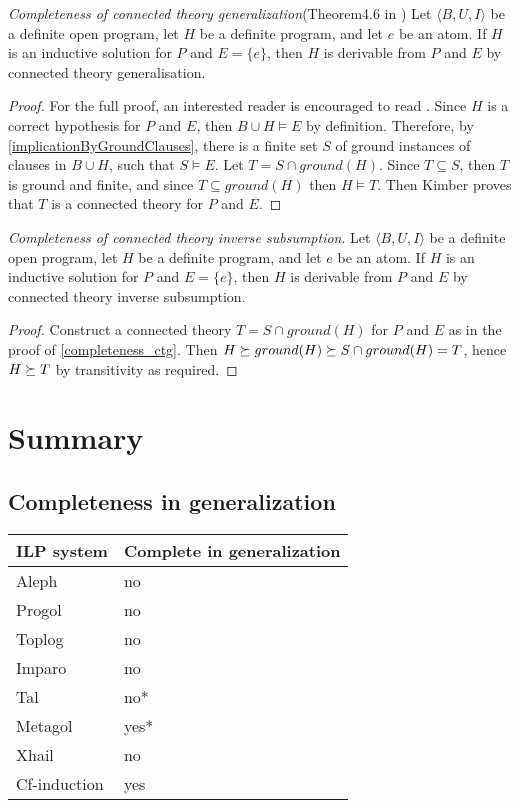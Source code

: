\begin{thm}\label{completeness_ctg}
\emph{Completeness of connected theory generalization}(Theorem4.6 in \cite{kimber2012learning})
Let $\langle B, U, I \rangle$ be a definite open program,
let $H$ be a definite program, and let $e$ be an atom.
If $H$ is an inductive solution for $P$ and
$E = \{e\}$, then $H$ is derivable from $P$ and $E$ by connected theory generalisation.
\end{thm}
\begin{proof}\cite{kimber2012learning}
For the full proof, an interested reader is encouraged to read \cite{kimber2012learning}.
Since $H$ is a correct hypothesis for $P$ and $E$,
then $B \cup H \models E$ by definition.
Therefore, by \ref{implicationByGroundClauses}, there is a finite set $S$ of ground instances of clauses in $B \cup H$,
such that $S \models E$. Let $T = S \cap ground(H)$.
Since $T \subseteq S$, then $T$ is ground and finite, and
since $T \subseteq ground(H)$ then $H \models T$. 
Then Kimber proves that $T$ is a connected theory for $P$ and $E$.
\end{proof}

\begin{thm}
\emph{Completeness of connected theory inverse subsumption}.
\label{completeness_ctis}
Let $\langle B, U, I \rangle$ be a definite open program,
let $H$ be a definite program, and let $e$ be an atom.
If $H$ is an inductive solution for $P$ and
$E = \{e\}$, then $H$ is derivable from $P$ and $E$ by connected theory inverse subsumption.
\end{thm}
\begin{proof}
Construct a connected theory $T=S \cap ground(H)$ for $P$ and $E$ as in the proof of \ref{completeness_ctg}.
Then $H \succeq ground(H) \succeq S \cap ground(H) = T$,
hence $H \succeq T$ by transitivity as required.
\end{proof}

\section{Summary}

\subsection{Completeness in generalization\cite{yamamoto2012inverse}}
\begin{center}
    \begin{tabular}{ | l | p{5cm} |}
    \hline
    ILP system &  Complete in generalization \\ \hline
    Aleph & no\\ \hline
    Progol & no\\ \hline
    Toplog & no\\ \hline
    Imparo & no\\ \hline
    Tal & no*\\ \hline
    Metagol & yes*\\ \hline
    Xhail & no\\ \hline
    Cf-induction & yes\\
    \hline
    \end{tabular}
\end{center}



